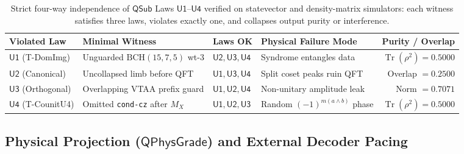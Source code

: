 \documentclass[acmsmall,screen,anonymous]{acmart}
\DeclareRobustCommand{\_}{\ifmmode\text{\char95}\else\char95\penalty0\relax\fi}
\theoremstyle{plain}
\newcommand{\QSub}{\ensuremath{\mathsf{QSub}}}
\newcommand{\QPhysGrade}{\ensuremath{\mathsf{QPhysGrade}}}
\begin{document}
\begin{table}[t]
\centering
\caption{Strict four-way independence of $\QSub$ Laws $\mathsf{U1}$--$\mathsf{U4}$ verified on statevector and density-matrix simulators: each witness satisfies three laws, violates exactly one, and collapses output purity or interference.}
\label{tab:t11}
\footnotesize
\setlength{\tabcolsep}{4pt}
\begin{tabular}{llllr}
\toprule
Violated Law & Minimal Witness & Laws OK & Physical Failure Mode & Purity / Overlap \\
\midrule
$\mathsf{U1}$ (\textsf{T-DomImg}) & Unguarded $\mathrm{BCH}(15,7,5)$ wt-$3$ & $\mathsf{U2},\mathsf{U3},\mathsf{U4}$ & Syndrome entangles data & $\operatorname{Tr}(\rho^2) = 0.5000$ \\
$\mathsf{U2}$ (Canonical) & Uncollapsed limb before QFT & $\mathsf{U1},\mathsf{U3},\mathsf{U4}$ & Split coset peaks ruin QFT & Overlap $= 0.2500$ \\
$\mathsf{U3}$ (Orthogonal) & Overlapping VTAA prefix guard & $\mathsf{U1},\mathsf{U2},\mathsf{U4}$ & Non-unitary amplitude leak & Norm $= 0.7071$ \\
$\mathsf{U4}$ (\textsf{T-CounitU4}) & Omitted \texttt{cond-cz} after $M_X$ & $\mathsf{U1},\mathsf{U2},\mathsf{U3}$ & Random $(-1)^{m(a \land b)}$ phase & $\operatorname{Tr}(\rho^2) = 0.5000$ \\
\bottomrule
\end{tabular}
\end{table}

\subsection{Physical Projection ($\QPhysGrade$) and External Decoder Pacing}
\label{sec:qphys}
\end{document}
